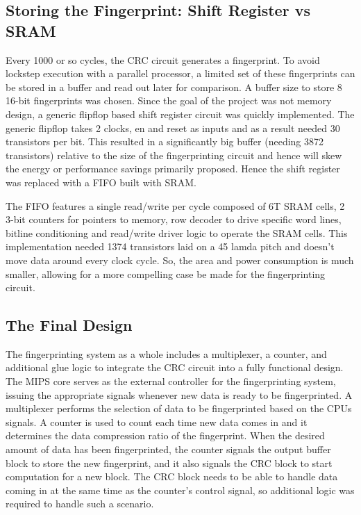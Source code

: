\documentclass[12pt,journal,compsoc]{IEEEtran}
\begin{document}
\subsection{Storing the Fingerprint: Shift Register vs SRAM}
Every 1000 or so cycles, the CRC circuit generates a fingerprint. To avoid lockstep execution with a parallel processor, a limited set of these fingerprints can be stored in a buffer and read out later for comparison. A buffer size to store 8 16-bit fingerprints was chosen. Since the goal of the project was not memory design, a generic flipflop based shift register circuit was quickly implemented. The generic flipflop takes 2 clocks, en and reset as inputs and as a result needed 30 transistors per bit. This resulted in a significantly big buffer (needing 3872 transistors) relative to the size of the fingerprinting circuit and hence will skew the energy or performance savings primarily proposed. Hence the shift register was replaced with a FIFO built with SRAM. 

The FIFO features a single read/write per cycle composed of 6T SRAM cells, 2 3-bit counters for pointers to memory, row decoder to drive specific word lines, bitline conditioning and read/write driver logic to operate the SRAM cells. This implementation needed 1374 transistors laid on a 45 lamda pitch and doesn’t move data around every clock cycle. So, the area and power consumption is much smaller, allowing for a more compelling case be made for the fingerprinting circuit. 


\subsection{The Final Design}
The fingerprinting system as a whole includes a multiplexer, a counter, and additional glue logic to integrate the CRC circuit into a fully functional design. The MIPS core serves as the external controller for the fingerprinting system, issuing the appropriate signals whenever new data is ready to be fingerprinted. A multiplexer performs the selection of data to be fingerprinted based on the CPUs signals. A counter is used to count each time new data comes in and it determines the data compression ratio of the fingerprint. When the desired amount of data has been fingerprinted, the counter signals the output buffer block to store the new fingerprint, and it also signals the CRC block to start computation for a new block. The CRC block needs to be able to handle data coming in at the same time as the counter's control signal, so additional logic was required to handle such a scenario. 
\end{document}

